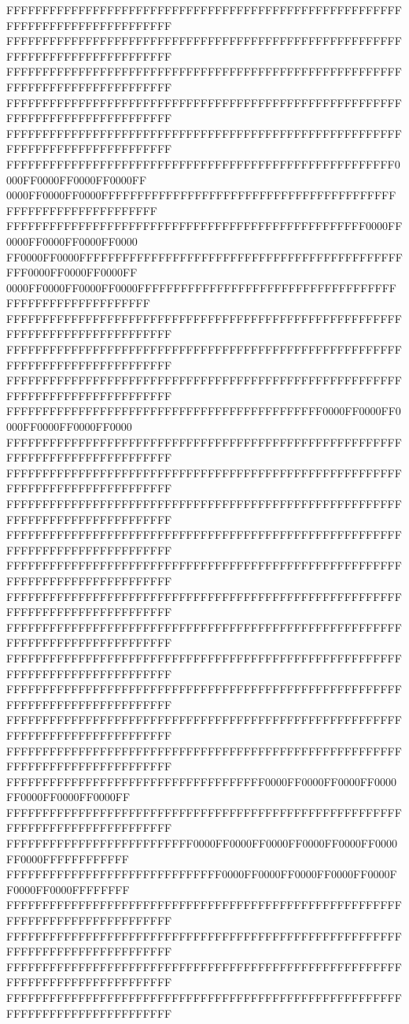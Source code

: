 FFFFFFFFFFFFFFFFFFFFFFFFFFFFFFFFFFFFFFFFFFFFFFFFFFFFFFFFFFFFFFFFFFFFFFFFFFFFFF
FFFFFFFFFFFFFFFFFFFFFFFFFFFFFFFFFFFFFFFFFFFFFFFFFFFFFFFFFFFFFFFFFFFFFFFFFFFFFF
FFFFFFFFFFFFFFFFFFFFFFFFFFFFFFFFFFFFFFFFFFFFFFFFFFFFFFFFFFFFFFFFFFFFFFFFFFFFFF
FFFFFFFFFFFFFFFFFFFFFFFFFFFFFFFFFFFFFFFFFFFFFFFFFFFFFFFFFFFFFFFFFFFFFFFFFFFFFF
FFFFFFFFFFFFFFFFFFFFFFFFFFFFFFFFFFFFFFFFFFFFFFFFFFFFFFFFFFFFFFFFFFFFFFFFFFFFFF
FFFFFFFFFFFFFFFFFFFFFFFFFFFFFFFFFFFFFFFFFFFFFFFFFFFFFF0000FF0000FF0000FF0000FF
0000FF0000FF0000FFFFFFFFFFFFFFFFFFFFFFFFFFFFFFFFFFFFFFFFFFFFFFFFFFFFFFFFFFFFFF
FFFFFFFFFFFFFFFFFFFFFFFFFFFFFFFFFFFFFFFFFFFFFFFFFF0000FF0000FF0000FF0000FF0000
FF0000FF0000FFFFFFFFFFFFFFFFFFFFFFFFFFFFFFFFFFFFFFFFFFFFFFFF0000FF0000FF0000FF
0000FF0000FF0000FF0000FFFFFFFFFFFFFFFFFFFFFFFFFFFFFFFFFFFFFFFFFFFFFFFFFFFFFFFF
FFFFFFFFFFFFFFFFFFFFFFFFFFFFFFFFFFFFFFFFFFFFFFFFFFFFFFFFFFFFFFFFFFFFFFFFFFFFFF
FFFFFFFFFFFFFFFFFFFFFFFFFFFFFFFFFFFFFFFFFFFFFFFFFFFFFFFFFFFFFFFFFFFFFFFFFFFFFF
FFFFFFFFFFFFFFFFFFFFFFFFFFFFFFFFFFFFFFFFFFFFFFFFFFFFFFFFFFFFFFFFFFFFFFFFFFFFFF
FFFFFFFFFFFFFFFFFFFFFFFFFFFFFFFFFFFFFFFFFFFF0000FF0000FF0000FF0000FF0000FF0000
FFFFFFFFFFFFFFFFFFFFFFFFFFFFFFFFFFFFFFFFFFFFFFFFFFFFFFFFFFFFFFFFFFFFFFFFFFFFFF
FFFFFFFFFFFFFFFFFFFFFFFFFFFFFFFFFFFFFFFFFFFFFFFFFFFFFFFFFFFFFFFFFFFFFFFFFFFFFF
FFFFFFFFFFFFFFFFFFFFFFFFFFFFFFFFFFFFFFFFFFFFFFFFFFFFFFFFFFFFFFFFFFFFFFFFFFFFFF
FFFFFFFFFFFFFFFFFFFFFFFFFFFFFFFFFFFFFFFFFFFFFFFFFFFFFFFFFFFFFFFFFFFFFFFFFFFFFF
FFFFFFFFFFFFFFFFFFFFFFFFFFFFFFFFFFFFFFFFFFFFFFFFFFFFFFFFFFFFFFFFFFFFFFFFFFFFFF
FFFFFFFFFFFFFFFFFFFFFFFFFFFFFFFFFFFFFFFFFFFFFFFFFFFFFFFFFFFFFFFFFFFFFFFFFFFFFF
FFFFFFFFFFFFFFFFFFFFFFFFFFFFFFFFFFFFFFFFFFFFFFFFFFFFFFFFFFFFFFFFFFFFFFFFFFFFFF
FFFFFFFFFFFFFFFFFFFFFFFFFFFFFFFFFFFFFFFFFFFFFFFFFFFFFFFFFFFFFFFFFFFFFFFFFFFFFF
FFFFFFFFFFFFFFFFFFFFFFFFFFFFFFFFFFFFFFFFFFFFFFFFFFFFFFFFFFFFFFFFFFFFFFFFFFFFFF
FFFFFFFFFFFFFFFFFFFFFFFFFFFFFFFFFFFFFFFFFFFFFFFFFFFFFFFFFFFFFFFFFFFFFFFFFFFFFF
FFFFFFFFFFFFFFFFFFFFFFFFFFFFFFFFFFFFFFFFFFFFFFFFFFFFFFFFFFFFFFFFFFFFFFFFFFFFFF
FFFFFFFFFFFFFFFFFFFFFFFFFFFFFFFFFFFF0000FF0000FF0000FF0000FF0000FF0000FF0000FF
FFFFFFFFFFFFFFFFFFFFFFFFFFFFFFFFFFFFFFFFFFFFFFFFFFFFFFFFFFFFFFFFFFFFFFFFFFFFFF
FFFFFFFFFFFFFFFFFFFFFFFFFF0000FF0000FF0000FF0000FF0000FF0000FF0000FFFFFFFFFFFF
FFFFFFFFFFFFFFFFFFFFFFFFFFFFFF0000FF0000FF0000FF0000FF0000FF0000FF0000FFFFFFFF
FFFFFFFFFFFFFFFFFFFFFFFFFFFFFFFFFFFFFFFFFFFFFFFFFFFFFFFFFFFFFFFFFFFFFFFFFFFFFF
FFFFFFFFFFFFFFFFFFFFFFFFFFFFFFFFFFFFFFFFFFFFFFFFFFFFFFFFFFFFFFFFFFFFFFFFFFFFFF
FFFFFFFFFFFFFFFFFFFFFFFFFFFFFFFFFFFFFFFFFFFFFFFFFFFFFFFFFFFFFFFFFFFFFFFFFFFFFF
FFFFFFFFFFFFFFFFFFFFFFFFFFFFFFFFFFFFFFFFFFFFFFFFFFFFFFFFFFFFFFFFFFFFFFFFFFFFFF
